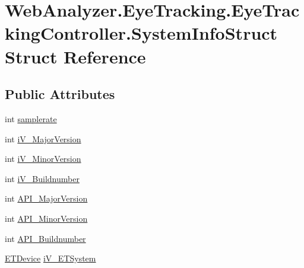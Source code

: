 \hypertarget{struct_web_analyzer_1_1_eye_tracking_1_1_eye_tracking_controller_1_1_system_info_struct}{}\section{Web\+Analyzer.\+Eye\+Tracking.\+Eye\+Tracking\+Controller.\+System\+Info\+Struct Struct Reference}
\label{struct_web_analyzer_1_1_eye_tracking_1_1_eye_tracking_controller_1_1_system_info_struct}
\subsection*{Public Attributes}
\begin{DoxyCompactItemize}
\item 
int \hyperlink{struct_web_analyzer_1_1_eye_tracking_1_1_eye_tracking_controller_1_1_system_info_struct_ad01eaf2951431e56461a816f587d5957}{samplerate}
\item 
int \hyperlink{struct_web_analyzer_1_1_eye_tracking_1_1_eye_tracking_controller_1_1_system_info_struct_ab64555809b3f5e516a6248565ee79ac7}{i\+V\+\_\+\+Major\+Version}
\item 
int \hyperlink{struct_web_analyzer_1_1_eye_tracking_1_1_eye_tracking_controller_1_1_system_info_struct_ab19d06d21510b7f2bc3c3bd181abe574}{i\+V\+\_\+\+Minor\+Version}
\item 
int \hyperlink{struct_web_analyzer_1_1_eye_tracking_1_1_eye_tracking_controller_1_1_system_info_struct_ad0f2f37105684576f8cdda148d95e7e6}{i\+V\+\_\+\+Buildnumber}
\item 
int \hyperlink{struct_web_analyzer_1_1_eye_tracking_1_1_eye_tracking_controller_1_1_system_info_struct_a7148791f8fe6f4b0ada463c56a2e7c45}{A\+P\+I\+\_\+\+Major\+Version}
\item 
int \hyperlink{struct_web_analyzer_1_1_eye_tracking_1_1_eye_tracking_controller_1_1_system_info_struct_af2f7219b536721705ade198477ae2eae}{A\+P\+I\+\_\+\+Minor\+Version}
\item 
int \hyperlink{struct_web_analyzer_1_1_eye_tracking_1_1_eye_tracking_controller_1_1_system_info_struct_a3ac6efe197b8764eb8bd11a37bbfb0b0}{A\+P\+I\+\_\+\+Buildnumber}
\item 
\hyperlink{class_web_analyzer_1_1_eye_tracking_1_1_eye_tracking_controller_abcdd24877ea4dbb83d00b719e7763cfb}{E\+T\+Device} \hyperlink{struct_web_analyzer_1_1_eye_tracking_1_1_eye_tracking_controller_1_1_system_info_struct_ad29a1a044256a622b17cfe00fc48f62b}{i\+V\+\_\+\+E\+T\+System}
\end{DoxyCompactItemize}


